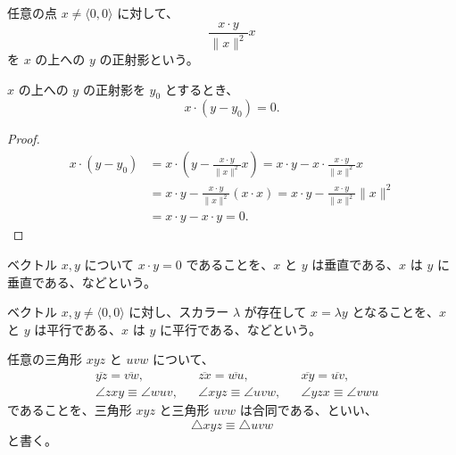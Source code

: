 
\begin{dfn}
  任意の点 \(x\neq\langle0,0\rangle\) に対して、
  \[\frac{x\cdot y}{\|x\|^2}x\]
  を \(x\) の上への \(y\) の正射影という。
\end{dfn}


\begin{thm}\label{260427130101}
  \(x\) の上への \(y\) の正射影を \(y_0\) とするとき、
  \[x\cdot(y-y_0)=0.\]
\end{thm}

\begin{proof}
  \begin{align*}
    x\cdot(y-y_0) &=x\cdot\left(y-\frac{x\cdot y}{\|x\|^2}x\right)=x\cdot y-x\cdot\frac{x\cdot y}{\|x\|^2}x \\
                  &=x\cdot y-\frac{x\cdot y}{\|x\|^2}(x\cdot x)=x\cdot y-\frac{x\cdot y}{\|x\|^2}\|x\|^2 \\
                  &=x\cdot y-x\cdot y=0.
  \end{align*}
\end{proof}


\begin{dfn}
  ベクトル \(x,y\) について \(x\cdot y=0\) であることを、\(x\) と \(y\) は垂直である、\(x\) は \(y\) に垂直である、などという。
\end{dfn}


\begin{dfn}
  ベクトル \(x,y\neq\langle0,0\rangle\) に対し、スカラー \(\lambda\) が存在して \(x=\lambda y\) となることを、\(x\) と \(y\) は平行である、\(x\) は \(y\) に平行である、などという。
\end{dfn}


\begin{dfn}
  任意の三角形 \(xyz\) と \(uvw\) について、
  \begin{align*}
    & \overline{yz}=\overline{vw}, && \overline{zx}=\overline{wu}, && \overline{xy}=\overline{uv}, \\
    & \angle zxy\equiv\angle wuv, && \angle xyz\equiv\angle uvw, && \angle yzx\equiv\angle vwu
  \end{align*}
  であることを、三角形 \(xyz\) と三角形 \(uvw\) は合同である、といい、
  \[\triangle xyz\equiv\triangle uvw\]
  と書く。
\end{dfn}

